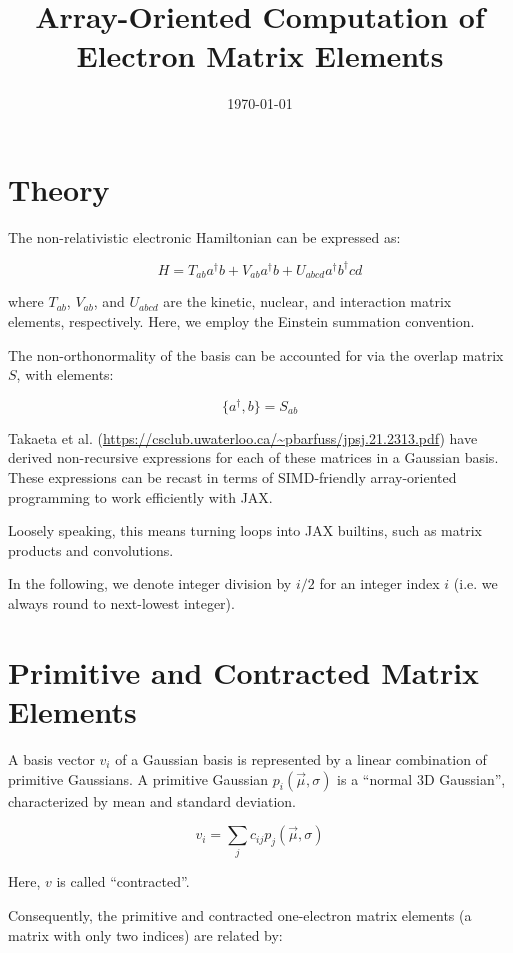 \documentclass[11pt]{article}
\date{\today}
\title{Array-Oriented Computation of Electron Matrix Elements}
\begin{document}
\maketitle
\tableofcontents


\section{Theory}
\label{sec:org8e7ade6}

The non-relativistic electronic Hamiltonian can be expressed as:

\[ H = T_{ab} a^\dagger b + V_{ab} a^\dagger b + U_{abcd} a^\dagger b^\dagger cd \]

where \(T_{ab}\), \(V_{ab}\), and \(U_{abcd}\) are the kinetic, nuclear, and interaction matrix elements, respectively. Here, we employ the Einstein summation convention.

The non-orthonormality of the basis can be accounted for via the overlap matrix \(S\), with elements:

\[ \{a^{\dagger}, b\} = S_{ab} \]

Takaeta et al. (\url{https://csclub.uwaterloo.ca/\~pbarfuss/jpsj.21.2313.pdf}) have derived non-recursive expressions for each of these matrices in a Gaussian basis.
These expressions can be recast in terms of SIMD-friendly array-oriented programming to work efficiently with JAX.

Loosely speaking, this means turning loops into JAX builtins, such as matrix products and convolutions.

In the following, we denote integer division by \(i / 2\) for an integer index \(i\) (i.e. we always round to next-lowest integer).

\section{Primitive and Contracted Matrix Elements}
\label{sec:org1627551}

A basis vector \(v_i\) of a Gaussian basis is represented by a linear combination of primitive Gaussians. A primitive Gaussian \(p_i(\vec{\mu}, \sigma)\)
is a ``normal 3D Gaussian'', characterized by mean and standard deviation.

\[ v_i = \sum_{j} c_{ij} p_j(\vec{\mu}, \sigma) \]

Here, \(v\) is called ``contracted''.

Consequently, the primitive and contracted one-electron matrix elements (a matrix with only two indices) are related by:
\end{document}
